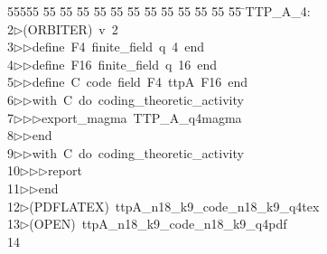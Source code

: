 %
%
\begin{tabbing}
55555 \= 55 \= 55 \= 55 \= 55 \= 55 \= 55 \= 55 \= 55 \= 55 \= 55 \= 55 \= 55 \= \>TTP\_A\_4:\\[0pt]
2\>$\triangleright$\>(ORBITER)\ v\ 2\ \\[0pt]
3\>$\triangleright$\>$\triangleright$\>define\ F4\ finite\_field\ q\ 4\ end\ \\[0pt]
4\>$\triangleright$\>$\triangleright$\>define\ F16\ finite\_field\ q\ 16\ end\ \\[0pt]
5\>$\triangleright$\>$\triangleright$\>define\ C\ code\ field\ F4\ ttpA\ F16\ end\ \\[0pt]
6\>$\triangleright$\>$\triangleright$\>with\ C\ do\ coding\_theoretic\_activity\ \\[0pt]
7\>$\triangleright$\>$\triangleright$\>$\triangleright$\>export\_magma\ TTP\_A\_q4magma\ \\[0pt]
8\>$\triangleright$\>$\triangleright$\>end\ \\[0pt]
9\>$\triangleright$\>$\triangleright$\>with\ C\ do\ coding\_theoretic\_activity\ \\[0pt]
10\>$\triangleright$\>$\triangleright$\>$\triangleright$\>report\ \\[0pt]
11\>$\triangleright$\>$\triangleright$\>end\\[0pt]
12\>$\triangleright$\>(PDFLATEX)\ ttpA\_n18\_k9\_code\_n18\_k9\_q4tex\\[0pt]
13\>$\triangleright$\>(OPEN)\ ttpA\_n18\_k9\_code\_n18\_k9\_q4pdf\\[0pt]
14\>\end{tabbing}
